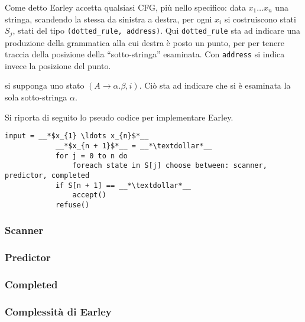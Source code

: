\documentclass{subfiles}
\begin{document}
Come detto Earley accetta qualsiasi CFG, più nello specifico: data \(x_{1} \ldots x_{n}\) una stringa,
scandendo la stessa da sinistra a destra, per ogni \(x_{i}\) si costruiscono stati \(S_{j}\), stati del tipo \lstinline{(dotted_rule, address)}.
Qui \lstinline{dotted_rule} sta ad indicare una produzione della grammatica alla cui destra è posto un punto,
per per tenere traccia della posizione della ``sotto-stringa'' esaminata. Con \lstinline{address} si indica invece la posizione del punto.

\begin{Example*}
    si supponga uno stato \((A \to \alpha . \beta, i)\). Ciò sta ad indicare che si è esaminata la sola sotto-stringa \(\alpha\).
\end{Example*}

\begin{Algorithm*}[di Earley]
    Si riporta di seguito lo pseudo codice per implementare Earley.
    \begin{center}
        \begin{lstlisting}[language = PSEUDO]
            input = __*$x_{1} \ldots x_{n}$*__
            __*$x_{n + 1}$*__ = __*\textdollar*__
            for j = 0 to n do
                foreach state in S[j] choose between: scanner, predictor, completed
            if S[n + 1] == __*\textdollar*__
                accept()
            refuse()
        \end{lstlisting}
    \end{center}
\end{Algorithm*}

\subsubsection{Scanner}


\subsubsection{Predictor}


\subsubsection{Completed}


\subsubsection{Complessità di Earley}

\end{document}
